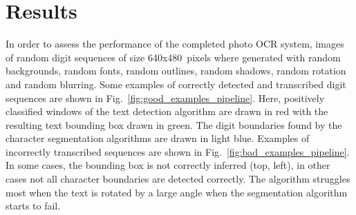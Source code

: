 \documentclass[12pt]{article}
\newcommand\figref[1]{Fig.~\ref{fig:#1}}
\begin{document}
\section{Results}
In order to assess the performance of the completed photo OCR system, images of random digit sequences
of size 640x480~pixels where generated with random backgrounds, random fonts, random outlines,
random shadows, random rotation and random blurring. Some examples of correctly detected and
transcribed digit sequences are shown in \figref{good_examples_pipeline}. Here, positively
classified windows of the text detection algorithm are drawn in red with the resulting
text bounding box drawn in green. The digit boundaries found by the character segmentation
algorithms are drawn in light blue. Examples of incorrectly transcribed sequences are
shown in \figref{bad_examples_pipeline}. In some cases, the bounding box is not correctly
inferred (top, left), in other cases not all character boundaries are detected correctly.
The algorithm struggles most when the text is rotated by a large angle when the segmentation
algorithm starts to fail.
\end{document}
